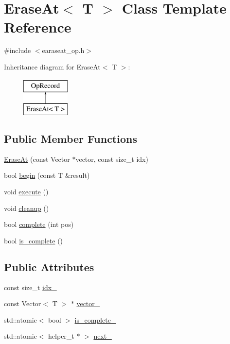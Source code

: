 \hypertarget{class_erase_at}{}\section{Erase\+At$<$ T $>$ Class Template Reference}
\label{class_erase_at}


{\ttfamily \#include $<$earaseat\+\_\+op.\+h$>$}

Inheritance diagram for Erase\+At$<$ T $>$\+:\begin{figure}[H]
\begin{center}
\leavevmode
\includegraphics[height=2.000000cm]{class_erase_at}
\end{center}
\end{figure}
\subsection*{Public Member Functions}
\begin{DoxyCompactItemize}
\item 
\hyperlink{class_erase_at_a4f96bd2292727d90cecbaac7aa356aeb}{Erase\+At} (const Vector $\ast$vector, const size\+\_\+t idx)
\item 
bool \hyperlink{class_erase_at_a8db28ef12f418e3e7bc745fb32038b78}{begin} (const T \&result)
\item 
void \hyperlink{class_erase_at_ac69fc35afacc8da116cf093f100fff69}{execute} ()
\item 
void \hyperlink{class_erase_at_a47c62ba991eb506ffe67a73e0317673d}{cleanup} ()
\item 
bool \hyperlink{class_erase_at_ae8f9925c82a249f5467da3036747d340}{complete} (int pos)
\item 
bool \hyperlink{class_erase_at_a6f6a5c68a1bae7683b10f403702f0f88}{is\+\_\+complete} ()
\end{DoxyCompactItemize}
\subsection*{Public Attributes}
\begin{DoxyCompactItemize}
\item 
const size\+\_\+t \hyperlink{class_erase_at_ab067b4f8d097677748b1cd081730e450}{idx\+\_\+}
\item 
const Vector$<$ T $>$ $\ast$ \hyperlink{class_erase_at_a7a24a5872cd3fa48cb71711b96e15af9}{vector\+\_\+}
\item 
std\+::atomic$<$ bool $>$ \hyperlink{class_erase_at_a7a0e20cf5a5e02822dd1d0a3d486920c}{is\+\_\+complete\+\_\+}
\item 
std\+::atomic$<$ helper\+\_\+t $\ast$ $>$ \hyperlink{class_erase_at_a6fe6f561569a440fa9f8631d6c06d895}{next\+\_\+}
\end{DoxyCompactItemize}



